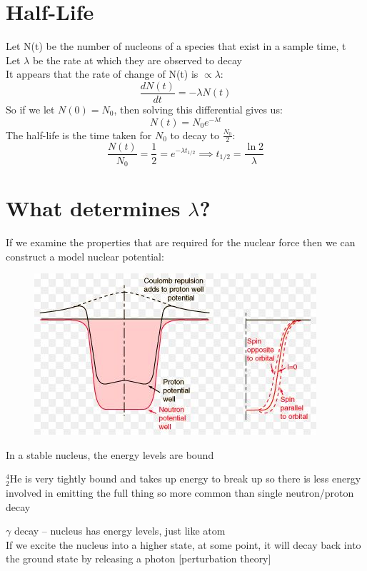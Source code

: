 \documentclass[a4paper, 11pt, fleqn, normalem]{report}
\begin{document}
\section{Half-Life}
Let N(t) be the number of nucleons of a species that exist in a sample time, t \\
Let $\lambda$ be the rate at which they are observed to decay \\
It appears that the rate of change of N(t) is $\propto \lambda$:
\begin{equation*}
    \frac{dN(t)}{dt} = -\lambda N(t)
\end{equation*}
So if we let $N(0) = N_{0}$, then solving this differential gives us:
\begin{equation*}
    N(t) = N_{0}e^{-\lambda t}
\end{equation*}
The half-life is the time taken for $N_{0}$ to decay to $\frac{N_{0}}{2}$:
\begin{equation*}
    \frac{N(t)}{N_{0}} = \frac{1}{2} = e^{-\lambda t_{1/2}} \implies t_{1/2} = \frac{\ln{2}}{\lambda}
\end{equation*}

\newpage
\section{What determines $\lambda$?}
If we examine the properties that are required for the nuclear force then we can construct a model nuclear potential:
\begin{figure}[H]
    \includegraphics{lamb.jpg}
\end{figure}
In a stable nucleus, the energy levels are bound

$_{2}^{4}$He is very tightly bound and takes up energy to break up so there is less energy involved in emitting the full thing so more common than single neutron/proton decay

$\gamma$ decay -- nucleus has energy levels, just like atom \\
If we excite the nucleus into a higher state, at some point, it will decay back into the ground state by releasing a photon [perturbation theory]
\end{document}
